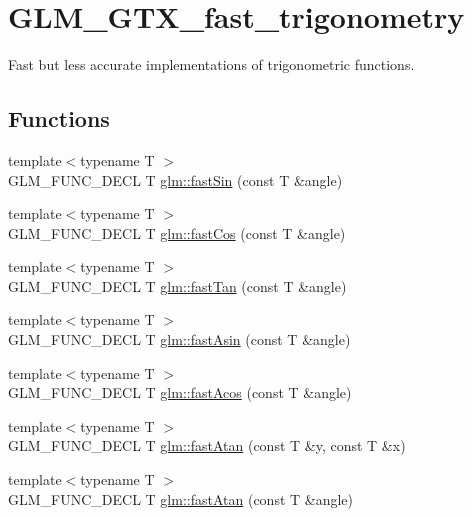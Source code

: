 \hypertarget{group__gtx__fast__trigonometry}{\section{G\-L\-M\-\_\-\-G\-T\-X\-\_\-fast\-\_\-trigonometry}
\label{group__gtx__fast__trigonometry}
}


Fast but less accurate implementations of trigonometric functions.  


\subsection*{Functions}
\begin{DoxyCompactItemize}
\item 
{\footnotesize template$<$typename T $>$ }\\G\-L\-M\-\_\-\-F\-U\-N\-C\-\_\-\-D\-E\-C\-L T \hyperlink{group__gtx__fast__trigonometry_ga01b7dc431bf5f5e6acce7d6bba311f86}{glm\-::fast\-Sin} (const T \&angle)
\item 
{\footnotesize template$<$typename T $>$ }\\G\-L\-M\-\_\-\-F\-U\-N\-C\-\_\-\-D\-E\-C\-L T \hyperlink{group__gtx__fast__trigonometry_gad54184beaba79e41db71a1f5711380c4}{glm\-::fast\-Cos} (const T \&angle)
\item 
{\footnotesize template$<$typename T $>$ }\\G\-L\-M\-\_\-\-F\-U\-N\-C\-\_\-\-D\-E\-C\-L T \hyperlink{group__gtx__fast__trigonometry_gae6615cdb40d8dc58115a07a21f495561}{glm\-::fast\-Tan} (const T \&angle)
\item 
{\footnotesize template$<$typename T $>$ }\\G\-L\-M\-\_\-\-F\-U\-N\-C\-\_\-\-D\-E\-C\-L T \hyperlink{group__gtx__fast__trigonometry_gab8595a77c5b215b95f662238dc3ff722}{glm\-::fast\-Asin} (const T \&angle)
\item 
{\footnotesize template$<$typename T $>$ }\\G\-L\-M\-\_\-\-F\-U\-N\-C\-\_\-\-D\-E\-C\-L T \hyperlink{group__gtx__fast__trigonometry_ga44e6efc3e776a51645fdf998e3e4f11b}{glm\-::fast\-Acos} (const T \&angle)
\item 
{\footnotesize template$<$typename T $>$ }\\G\-L\-M\-\_\-\-F\-U\-N\-C\-\_\-\-D\-E\-C\-L T \hyperlink{group__gtx__fast__trigonometry_gaf6234384b94846e29cf2c51dc245d484}{glm\-::fast\-Atan} (const T \&y, const T \&x)
\item 
{\footnotesize template$<$typename T $>$ }\\G\-L\-M\-\_\-\-F\-U\-N\-C\-\_\-\-D\-E\-C\-L T \hyperlink{group__gtx__fast__trigonometry_ga49b3b2b777b83eeed3e11205e800027e}{glm\-::fast\-Atan} (const T \&angle)
\end{DoxyCompactItemize}



